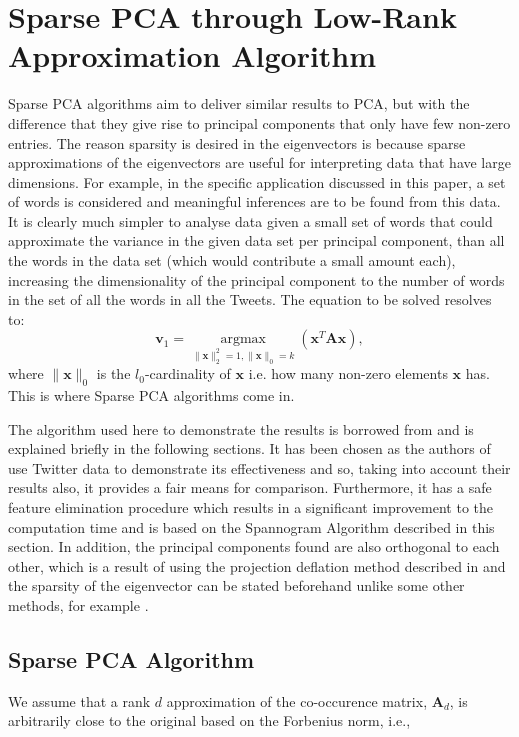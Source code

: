 \documentclass[graybox]{svmult}
\newcommand{\covmat}{\mathbf{A}}
\begin{document}
\section{Sparse PCA through Low-Rank Approximation Algorithm}\label{algorithm}

Sparse PCA algorithms aim to deliver similar results to PCA, but with the difference that they give rise to principal components that only have few non-zero entries. The reason sparsity is desired in the eigenvectors is because sparse approximations of the eigenvectors are useful for interpreting data that have large dimensions. For example, in the specific application discussed in this paper, a set of words is considered and meaningful inferences are to be found from this data. It is clearly much simpler to analyse data given a small set of words that could approximate the variance in the given data set per principal component, than all the words in the data set (which would contribute a small amount each), increasing the dimensionality of the principal component to the number of words in the set of all the words in all the Tweets. The equation to be solved resolves to:
\begin{equation}
\mathbf{v}_1 = \underset{\|\mathbf{x}\|_2^2 = 1, \|\mathbf{x}\|_0 = k}{\operatorname{argmax}}\left( \mathbf{x}^T\mathbf{A}\mathbf{x}\right),
\end{equation}
where $\|\mathbf{x}\|_0$ is the $l_0$-cardinality of $\mathbf{x}$ i.e. how many non-zero elements $\mathbf{x}$ has. This is where Sparse PCA algorithms come in.

The algorithm used here to demonstrate the results is borrowed from \cite{dimakis} and is explained briefly in the following sections. It has been chosen as the authors of \cite{dimakis} use Twitter data to demonstrate its effectiveness and so, taking into account their results also, it provides a fair means for comparison. Furthermore, it has a safe feature elimination procedure which results in a significant improvement to the computation time and is based on the Spannogram Algorithm described in this section. In addition, the principal components found are also orthogonal to each other, which is a result of using the projection deflation method described in \cite{Mackey_deflationmethods} and the sparsity of the eigenvector can be stated beforehand unlike some other methods, for example \cite{GPower}.

\subsection{Sparse PCA Algorithm}
We assume that a rank $d$ approximation of the co-occurence matrix, $\covmat_d$, is arbitrarily close to the original based on the Forbenius norm, i.e.,
\end{document}
